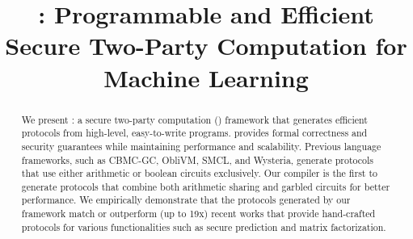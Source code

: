\documentclass[conference]{IEEEtran}
\begin{document}
\title{\tool: Programmable and Efficient Secure Two-Party Computation for Machine Learning}




\maketitle

\begin{abstract}
We present \tool: a 
secure two-party computation (\mpc) framework that generates efficient
\mpc protocols from high-level, easy-to-write programs.
\tool provides formal correctness and security guarantees while maintaining performance and scalability.
Previous language frameworks, such as CBMC-GC, ObliVM, SMCL, and
Wysteria,
generate protocols that use either arithmetic or boolean
circuits exclusively. Our compiler is the first to generate protocols
that combine both arithmetic sharing and garbled circuits  for better
performance.
We
empirically demonstrate that the
protocols generated by our framework match or outperform (up to
19x)
recent works that provide hand-crafted protocols for various
functionalities such as secure  prediction  and matrix factorization.

\end{abstract}


\graphicspath{{./Images/}}


%
%

















%
%

\appendix

%



%
\end{document}
